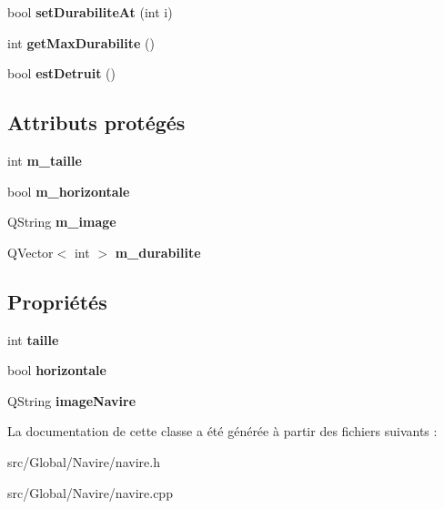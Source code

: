 \begin{DoxyCompactItemize}
\item 
bool {\bfseries set\+Durabilite\+At} (int i)\hypertarget{class_navire_acea86f1c993f4c6e334c20770936c83d}{}\label{class_navire_acea86f1c993f4c6e334c20770936c83d}

\item 
int {\bfseries get\+Max\+Durabilite} ()\hypertarget{class_navire_af84c7380003b15256c703e455842661c}{}\label{class_navire_af84c7380003b15256c703e455842661c}

\item 
bool {\bfseries est\+Detruit} ()\hypertarget{class_navire_a6db2583256f6042cedb86aa8f08c938b}{}\label{class_navire_a6db2583256f6042cedb86aa8f08c938b}

\end{DoxyCompactItemize}
\subsection*{Attributs protégés}
\begin{DoxyCompactItemize}
\item 
int {\bfseries m\+\_\+taille}\hypertarget{class_navire_a208c375a82e7470faa5f945d437e3997}{}\label{class_navire_a208c375a82e7470faa5f945d437e3997}

\item 
bool {\bfseries m\+\_\+horizontale}\hypertarget{class_navire_a9ab74f347ff2c82c93e9fe23dedeb535}{}\label{class_navire_a9ab74f347ff2c82c93e9fe23dedeb535}

\item 
Q\+String {\bfseries m\+\_\+image}\hypertarget{class_navire_a59dadd821c3d7d6704207e8bba2b727c}{}\label{class_navire_a59dadd821c3d7d6704207e8bba2b727c}

\item 
Q\+Vector$<$ int $>$ {\bfseries m\+\_\+durabilite}\hypertarget{class_navire_ac55a7c362a463586f19fd829dd49b49c}{}\label{class_navire_ac55a7c362a463586f19fd829dd49b49c}

\end{DoxyCompactItemize}
\subsection*{Propriétés}
\begin{DoxyCompactItemize}
\item 
int {\bfseries taille}\hypertarget{class_navire_a71cc2dbc39ff07887bbd806f69779411}{}\label{class_navire_a71cc2dbc39ff07887bbd806f69779411}

\item 
bool {\bfseries horizontale}\hypertarget{class_navire_a4d4cbbde75bbd7446634b17a3165d833}{}\label{class_navire_a4d4cbbde75bbd7446634b17a3165d833}

\item 
Q\+String {\bfseries image\+Navire}\hypertarget{class_navire_a27d860bfbc5a4a1c7b4679c8ba008eda}{}\label{class_navire_a27d860bfbc5a4a1c7b4679c8ba008eda}

\end{DoxyCompactItemize}


La documentation de cette classe a été générée à partir des fichiers suivants \+:\begin{DoxyCompactItemize}
\item 
src/\+Global/\+Navire/navire.\+h\item 
src/\+Global/\+Navire/navire.\+cpp\end{DoxyCompactItemize}
